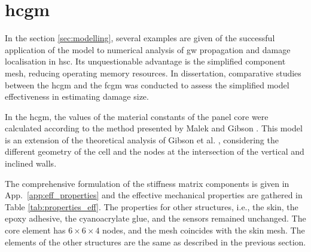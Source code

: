 \section{\Acf{hcgm}}
\label{sec:homogenised}

In the section \ref{sec:modelling}, several examples are given of the successful application of the model to numerical analysis of \ac{gw} propagation and damage localisation in \ac{hsc}.
Its unquestionable advantage is the simplified component mesh, reducing operating memory resources.
In dissertation, comparative studies between the \ac{hcgm} and the \ac{fcgm} was conducted to assess the simplified model effectiveness in estimating damage size.

In the \ac{hcgm}, the values of the material constants of the panel core were calculated according to the method presented by Malek and Gibson \cite{malek2015effective}.
This model is an extension of the theoretical analysis of Gibson et al. \cite{gibson1982mechanics}, considering the different geometry of the cell and the nodes at the intersection of the vertical and inclined walls.

The comprehensive formulation of the stiffness matrix components is given in App.~\ref{app:eff_properties} and the effective mechanical properties are gathered in Table \ref{tab:properties_eff}.
The properties for other structures, i.e., the skin, the epoxy adhesive, the cyanoacrylate glue, and the sensors remained unchanged.
The core element has \(6 \times 6 \times 4\) nodes, and the mesh coincides with the skin mesh.
The elements of the other structures are the same as described in the previous section.